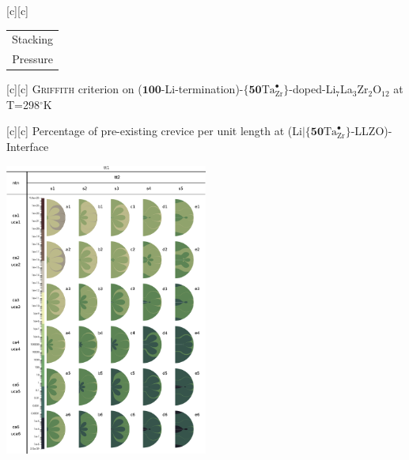 [c][c] {\footnotesize \begin{tabular}{@{}c@{}} Stacking \\ Pressure \end{tabular}}

[c][c] {\footnotesize \textsc{Griffith} criterion on ($\textbf{100}$-Li-termination)-$\{\textbf{50}\text{Ta}^{\bullet}_{\text{Zr}}\}$-doped-Li$_{7}$La$_{3}$Zr$_{2}$O$_{12}$ at T=298$^{\circ}$K}

[c][c] {\footnotesize Percentage of pre-existing crevice per unit length at (Li$|$$\{\textbf{50}\text{Ta}^{\bullet}_{\text{Zr}}\}$-LLZO)-Interface}

\includegraphics[width=0.5\textwidth]{contour_figs_Griffith_xx_Ta_pressure_crevice_298K_noframed.eps}